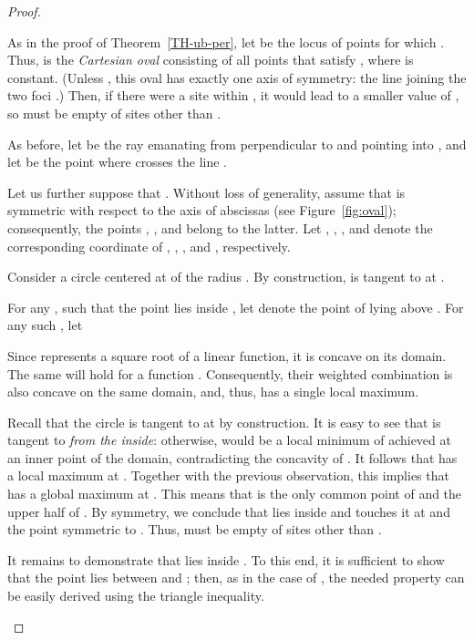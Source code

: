 \documentclass[10pt, conference, compsocconf]{IEEEtran}
\begin{document}
\begin{proof}
\begin{itemize}
      As in the proof of Theorem~\ref{TH-ub-per}, let  be
      the locus of points  for which .
      Thus,  is the \emph{Cartesian oval} 
      consisting of all points  that satisfy , where
       is constant.  (Unless , this oval has exactly
      one axis of symmetry: the line joining the two foci .)
      Then, if there were a site  within , it would lead
      to a smaller value of , so  must be empty of
      sites other than .

      As before, let  be the ray emanating from  perpendicular
      to and pointing into , and let  be the point where
       crosses the line .

      Let us further suppose that . Without loss of generality,
      assume that  is symmetric with respect to the axis of
      abscissas (see Figure~\ref{fig:oval}); consequently, the points ,
      , and  belong to the latter.  Let , , , and 
      denote the corresponding coordinate of , , , and ,
      respectively.

      Consider a circle  centered at  of the radius .  By
      construction,  is tangent to  at .

      For any , such that the point  lies inside
      , let  denote the point of  lying above .  For any
      such , let
      
      Since  represents a square root of a linear function,
      it is concave on its domain.  The same will hold for a function
      .  Consequently, their weighted combination
       is also concave on the same domain, and,
      thus, has a single local maximum.

      Recall that the circle  is tangent to  at  by
      construction.
      It is easy to see that  is tangent to  \emph{from
      the inside}: otherwise,  would be a local minimum of 
      achieved at an inner point of the domain, contradicting the concavity
      of .  It follows that  has a local maximum at .
      Together with the previous observation, this implies that  has
      a global maximum at . This means that  is the only common
      point of  and the upper half of .  By symmetry, we
      conclude that  lies inside  and touches it at 
      and the point symmetric to .  Thus,  must be empty of sites
      other than .

      It remains to demonstrate that  lies inside .  To this end, it
      is sufficient to show that the point  lies between  and ;
      then, as in the case of , the needed property can be easily
      derived using the triangle inequality.


\end{itemize}
\end{proof}
\end{document}
